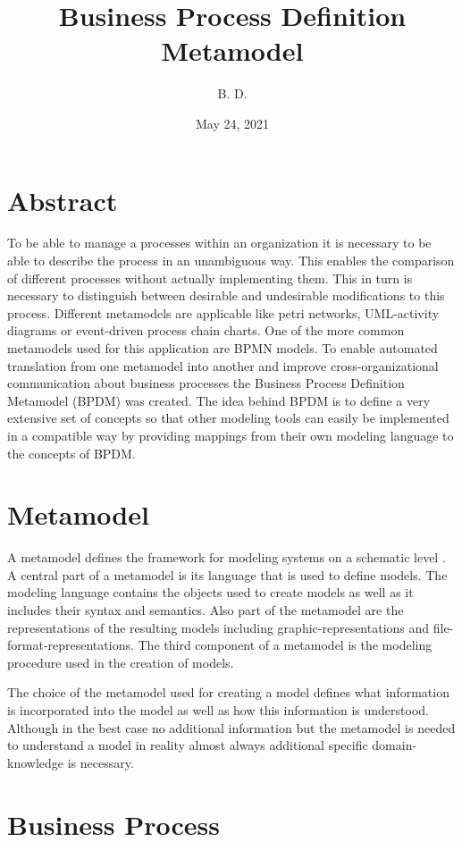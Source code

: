 \documentclass[a4paper,11pt]{article}
\title{Business Process Definition Metamodel}
\author{B. D.}
\date{May 24, 2021}
\begin{document}
\maketitle

\section{Abstract}
To be able to manage a processes within an organization it is necessary to be
able to describe the process in an unambiguous way. This enables the
comparison of different processes without actually implementing them. This in
turn is necessary to distinguish between desirable and undesirable
modifications to this process. Different metamodels are applicable like petri
networks, UML-activity diagrams or event-driven process chain charts. One of
the more common metamodels used for this application are BPMN models. To
enable automated translation from one metamodel into another and improve
cross-organizational communication about business processes the Business
Process Definition Metamodel (BPDM) was created. The idea behind BPDM is to
define a very extensive set of concepts so that other modeling tools can
easily be implemented in a compatible way by providing mappings from their own
modeling language to the concepts of BPDM.

\section{Metamodel}
A metamodel defines the framework for modeling systems on a schematic level
. A central part of a metamodel is its language that is used to define
models. The modeling language contains the objects used to create models as
well as it includes their syntax and semantics.  Also part of the metamodel
are the representations of the resulting models including
graphic-representations and file-format-representations.  The third component
of a metamodel is the modeling procedure used in the creation of
models. \cite{alfwi}

The choice of the metamodel used for creating a model defines what information
is incorporated into the model as well as how this information is
understood. Although in the best case no additional information but the
metamodel is needed to understand a model in reality almost always additional
specific domain-knowledge is necessary.

\section{Business Process} 
\end{document}
